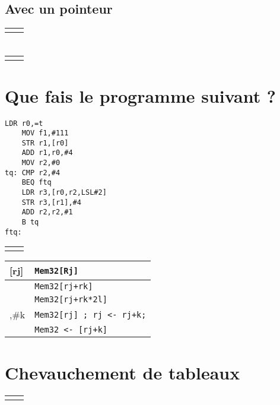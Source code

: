 \documentclass[12pt,a4paper,openany]{book}
\begin{document}
\subsection{Avec un pointeur}
\begin{tabular}{p{6cm}p{6cm}}

	&

\end{tabular}
\section{}
\begin{tabular}{p{6cm}p{6cm}}

	&

\end{tabular}
\section{Que fais le programme suivant ? }
\begin{lstlisting}[language=ARM]
	LDR r0,=t
	MOV f1,#111
	STR r1,[r0]
	ADD r1,r0,#4
	MOV r2,#0
tq: CMP r2,#4
	BEQ ftq
	LDR r3,[r0,r2,LSL#2]
	STR r3,[r1],#4
	ADD r2,r2,#1
	B tq
ftq:
\end{lstlisting}
\begin{tabular}{p{6cm}p{6cm}}

	&

\end{tabular}
\appendix
\begin{tabular}{l l}
	[rj] & \texttt{Mem32[Rj]}\\
	\hline
	[rj,rk] & \texttt{Mem32[rj+rk]}\\
	\hline
	[rj,rk,LSL\#l] & \texttt{Mem32[rj+rk*2l]}\\
	\hline
	[rj],\#k & \texttt{Mem32[rj] ; rj <- rj+k;}\\
	\hline
	[rj,\#k] & \texttt{Mem32 <- [rj+k]}\\
\end{tabular}
\section{Chevauchement de tableaux}
\begin{tabular}{p{6cm}p{6cm}}

	&

\end{tabular}
\end{document}
